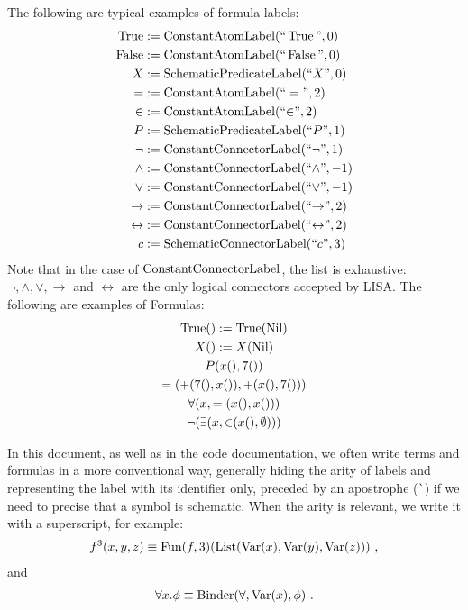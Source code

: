 \begin{example}[Formula]The following are typical examples of formula labels:
  \begin{align*}
    \operatorname{True}           & := \operatorname{ConstantAtomLabel}(``\operatorname{True}", 0)             \\
    \operatorname{False}          & := \operatorname{ConstantAtomLabel}(``\operatorname{False}", 0)            \\
    X               & := \operatorname{SchematicPredicateLabel}(``X", 0)                \\
    =               & := \operatorname{ConstantAtomLabel}(``=", 2)                 \\
    {\in}           & := \operatorname{ConstantAtomLabel}(``{\in}", 2)             \\
    P               & := \operatorname{SchematicPredicateLabel}(``P", 1)                \\
    \neg            & := \operatorname{ConstantConnectorLabel}(``{\neg}", 1)            \\
    \land           & := \operatorname{ConstantConnectorLabel}(``{\land}", -1)          \\
    \lor            & := \operatorname{ConstantConnectorLabel}(``{\lor}", -1)           \\
    \rightarrow     & := \operatorname{ConstantConnectorLabel}(``{\rightarrow}", 2)     \\
    \leftrightarrow & := \operatorname{ConstantConnectorLabel}(``{\leftrightarrow}", 2) \\
    c               & := \operatorname{SchematicConnectorLabel}(``{c}", 3)              \\
  \end{align*}
  Note that in the case of $\operatorname{ConstantConnectorLabel}$, the list is exhaustive: $\neg, \land, \lor, \rightarrow$ and $\leftrightarrow$ are the only logical connectors accepted by LISA.
  The following are examples of Formulas:
  \begin{gather*}
    \operatorname{True}() := \operatorname{True}(\operatorname{Nil})\\
    X() := X(\operatorname{Nil})\\
    P(x(), 7()) \\
    =(+(7(), x()), +(x(), 7()))\\
    \forall(x, =(x(), x())) \\
    \neg(\exists(x, {\in}(x(), \emptyset)))
  \end{gather*}
\end{example}

In this document, as well as in the code documentation, we often write terms and formulas in a more conventional way, generally hiding the arity of labels and representing the label with its identifier only, preceded by an apostrophe (\lstinline|`|) if we need to precise that a symbol is schematic. When the arity is relevant, we write it with a superscript, for example:
%
\begin{gather*}
  f^3(x,y,z) \equiv \operatorname{Fun}(f, 3)(\operatorname{List}(\operatorname{Var}(x), \operatorname{Var}(y), \operatorname{Var}(z)))~,
\end{gather*}
%
and
%
\begin{gather*}
  \forall x. \phi \equiv \operatorname{Binder}(\forall, \operatorname{Var}(x), \phi)~.
\end{gather*}

